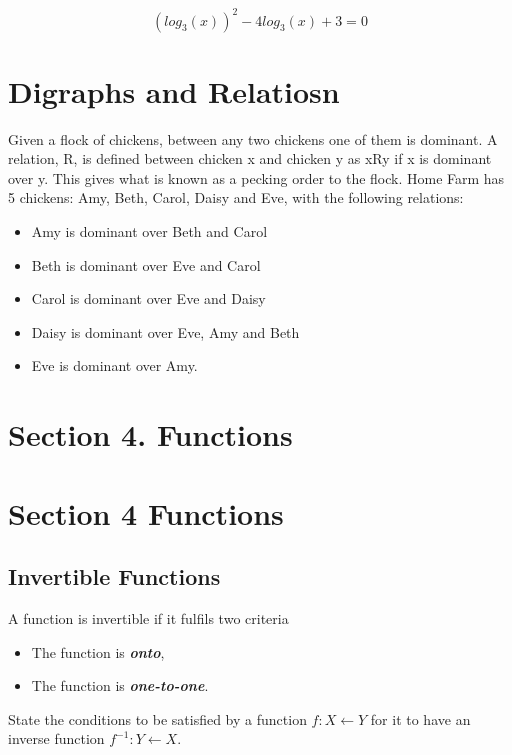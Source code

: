 \documentclass[]{report}
\begin{document}
\[ \left(log_3(x)\right)^2 - 4 log_3(x) + 3  = 0  \]

\section{Digraphs and Relatiosn}
Given a flock of chickens, between any two chickens one of them is
dominant. A relation, R, is defined between chicken x and chicken y as xRy if x is
dominant over y. This gives what is known as a pecking order to the flock. Home
Farm has 5 chickens: Amy, Beth, Carol, Daisy and Eve, with the following relations:

\begin{itemize}
	\item Amy is dominant over Beth and Carol
	\item Beth is dominant over Eve and Carol
	\item Carol is dominant over Eve and Daisy
	\item Daisy is dominant over Eve, Amy and Beth
	\item Eve is dominant over Amy.
\end{itemize}

\newpage

\section*{Section 4. Functions}





\section{Section 4 Functions}

\subsection{Invertible Functions}
A function is invertible if it fulfils two criteria
\begin{itemize}
	\item The function is \textbf{\textit{onto}},
	\item The function is \textbf{\textit{one-to-one}}.
\end{itemize}

State the conditions to be satisfied by a function
$f : X \leftarrow Y$ for it to have an inverse function
$f^{-1} : Y \leftarrow X$.
\end{document}
